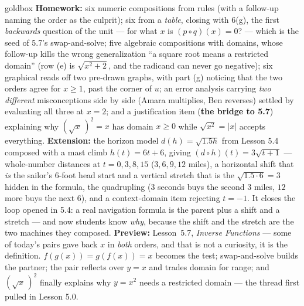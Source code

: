 \documentclass[10pt]{article}
\begin{document}
\begin{skillbox}{goldbox}
\textbf{Homework:} six numeric compositions from rules (with a follow-up naming the order as the
culprit); six from a \emph{table}, closing with 6(g), the first \emph{backwards} question of the
unit --- for what $x$ is $(p\circ q)(x)=0$? --- which is the seed of 5.7's swap-and-solve; five
algebraic compositions with domains, whose follow-up kills the wrong generalization ``a square root
means a restricted domain'' (row (e) is $\sqrt{x^{2}+2}$, and the radicand can never go negative);
six graphical reads off two pre-drawn graphs, with part (g) noticing that the two orders agree for
$x\ge1$, past the corner of $u$; an error analysis carrying \emph{two different} misconceptions
side by side (Amara multiplies, Ben reverses) settled by evaluating all three at $x=2$; and a
justification item (\textbf{the bridge to 5.7}) explaining why $\left(\sqrt{x}\,\right)^{2}=x$ has
domain $x\ge0$ while $\sqrt{x^{2}}=|x|$ accepts everything. \textbf{Extension:} the horizon model
$d(h)=\sqrt{1.5h}$ from Lesson 5.4 composed with a mast climb $h(t)=6t+6$, giving
$(d\circ h)(t)=3\sqrt{t+1}$ --- whole-number distances at $t=0,3,8,15$ ($3,6,9,12$ miles), a
horizontal shift that \emph{is} the sailor's $6$-foot head start and a vertical stretch that is the
$\sqrt{1.5\cdot6}=3$ hidden in the formula, the quadrupling ($3$ seconds buys the second $3$ miles,
$12$ more buys the next $6$), and a context-domain item rejecting $t=-1$. It closes the loop opened
in 5.4: a real navigation formula is the parent plus a shift and a stretch --- and now students know
\emph{why}, because the shift and the stretch are the two machines they composed.
\textbf{Preview:} Lesson~5.7, \emph{Inverse Functions} --- some of today's pairs gave back $x$ in
\emph{both} orders, and that is not a curiosity, it is the definition. $f(g(x))=g(f(x))=x$ becomes
the test; swap-and-solve builds the partner; the pair reflects over $y=x$ and trades domain for
range; and $\left(\sqrt{x}\,\right)^{2}$ finally explains why $y=x^{2}$ needs a restricted domain ---
the thread first pulled in Lesson 5.0.
\end{skillbox}
\end{document}
